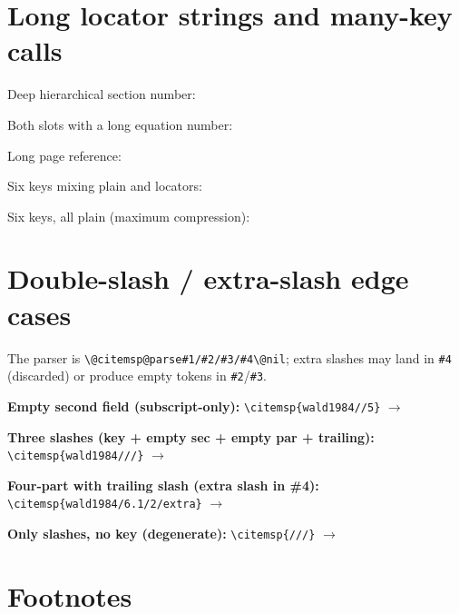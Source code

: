 \documentclass[11pt, a4paper]{article}
\begin{document}
\section{Long locator strings and many-key calls}

Deep hierarchical section number: 

\medskip\noindent
Both slots with a long equation number: 

\medskip\noindent
Long page reference: 

\medskip\noindent
Six keys mixing plain and locators:

\medskip\noindent
Six keys, all plain (maximum compression):


\section{Double-slash / extra-slash edge cases}

The parser is \verb|\@citemsp@parse#1/#2/#3/#4\@nil|; extra slashes may land
in \verb|#4| (discarded) or produce empty tokens in \verb|#2|/\verb|#3|.

\medskip\noindent
\textbf{Empty second field (subscript-only):}
\verb|\citemsp{wald1984//5}| $\to$ 

\medskip\noindent
\textbf{Three slashes (key + empty sec + empty par + trailing):}
\verb|\citemsp{wald1984///}| $\to$ 

\medskip\noindent
\textbf{Four-part with trailing slash (extra slash in \#4):}
\verb|\citemsp{wald1984/6.1/2/extra}| $\to$ 

\medskip\noindent
\textbf{Only slashes, no key (degenerate):}
\verb|\citemsp{///}| $\to$ \citemsp{///}


\section{Footnotes}
\end{document}
